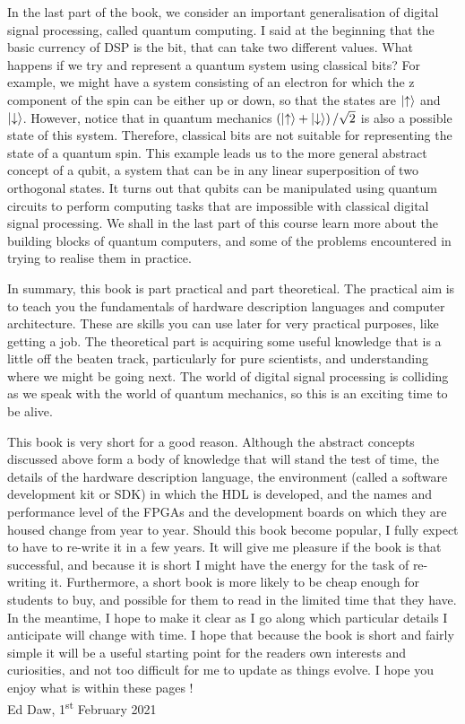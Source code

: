 \documentclass[../physical_computing.tex]{subfiles}
\begin{document}
In the last part of the book, we consider an important generalisation of digital signal processing, called quantum computing. I said at the beginning that the basic currency of DSP is the bit, that can take two different values. What happens if we try and represent a quantum system using classical bits? For example, we might have a system consisting of an electron for which the z component of the spin can be either up or down, so that the states are $\Ket{\uparrow}$ and $\Ket{\downarrow}$. However, notice that in quantum mechanics $\left(\Ket{\uparrow}+\Ket{\downarrow}\right)/\sqrt{2}$ is also a possible state of this system. Therefore, classical bits are not suitable for representing the state of a quantum spin. This example leads us to the more general abstract concept of a qubit, a system that can be in any linear superposition of two orthogonal states. It turns out that qubits can be manipulated using quantum circuits to perform computing tasks that are impossible with classical digital signal processing. We shall in the last part of this course learn more about the building blocks of quantum computers, and some of the problems encountered in trying to realise them in practice.

In summary, this book is part practical and part theoretical. The practical aim is to teach you the fundamentals of hardware description languages and computer architecture. These are skills you can use later for very practical purposes, like getting a job. The theoretical part is acquiring some useful knowledge that is a little off the beaten track, particularly for pure scientists, and understanding where we might be going next. The world of digital signal processing is colliding as we speak with the world of quantum mechanics, so this is an exciting time to be alive.

This book is very short for a good reason. Although the abstract concepts discussed above form a body of knowledge that will stand the test of time, the details of the hardware description language, the environment (called a software development kit or SDK) in which the HDL is developed, and the names and performance level of the FPGAs and the development boards on which they are housed change from year to year. Should this book become popular, I fully expect to have to re-write it in a few years. It will give me pleasure if the book is that successful, and because it is short I might have the energy for the task of re-writing it. Furthermore, a short book is more likely to be cheap enough for students to buy, and possible for them to read in the limited time that they have. In the meantime, I hope to make it clear as I go along which particular details I anticipate will change with time. I hope that because the book is short and fairly simple it will be a useful starting point for the readers own interests and curiosities, and not too difficult for me to update as things evolve. I hope you enjoy what is within these pages !\\

\noindent
Ed Daw, 1\textsuperscript{st} February 2021
\end{document}
